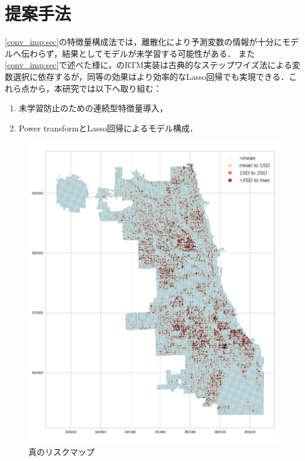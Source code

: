 \section{提案手法}
\label{chapter_3}
\cref{conv_imp:sec}の特徴量構成法では，離散化により予測変数の情報が十分にモデルへ伝わらず，結果としてモデルが未学習する可能性がある．
また\cref{conv_imp:sec}で述べた様に，\cite{caplan2015risk}のRTM実装は古典的なステップワイズ法\cite{islp}による変数選択に依存するが，同等の効果はより効率的なLasso回帰\cite{Lasso}でも実現できる．これら点から，本研究では以下へ取り組む：
\begin{enumerate}
  \item 未学習防止のための連続型特徴量導入，
  \item Power transformとLasso回帰によるモデル構成．
\end{enumerate}

\begin{figure}
  \centering 
  \includegraphics[scale=0.25]{./figures/actual_riskmap.png}
  \caption{真のリスクマップ}
  \label{fig:non-crime-timeseries-actual-risk}
\end{figure}


